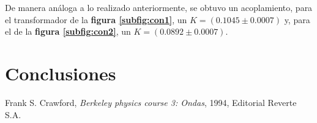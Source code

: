 \documentclass[11pt,a4paper]{article}
\begin{document}
De manera análoga a lo realizado anteriormente, se obtuvo un acoplamiento, para el transformador de la \textbf{figura \ref{subfig:con1}}, un $K=(0.1045\pm 0.0007)$ y, para el de la \textbf{figura \ref{subfig:con2}}, un $K=(0.0892 \pm 0.0007)$.



\section{Conclusiones}
\label{sec:conclusiones}










\begin{thebibliography}{1}
  Frank S. Crawford, \textit{Berkeley physics course 3: Ondas}, 1994, Editorial Reverte S.A.
\end{thebibliography}
 
\end{document}
